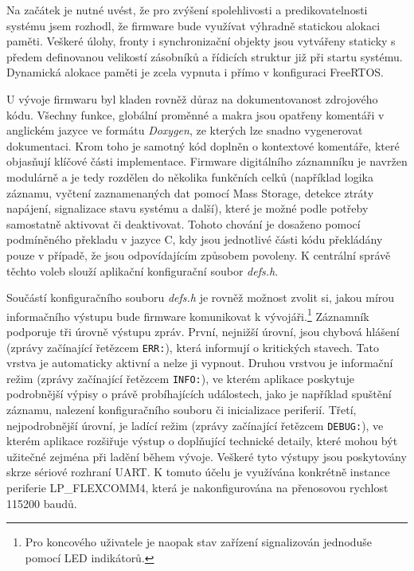 Na začátek je nutné uvést, že pro zvýšení spolehlivosti a predikovatelnosti systému jsem rozhodl, že firmware bude  využívat výhradně statickou alokaci paměti. Veškeré úlohy, fronty i synchronizační objekty jsou vytvářeny staticky s předem definovanou velikostí zásobníků a řídicích struktur již při startu systému. Dynamická alokace paměti je zcela vypnuta i přímo v konfiguraci FreeRTOS.

U vývoje firmwaru byl kladen rovněž důraz na dokumentovanost zdrojového kódu. Všechny funkce, globální proměnné a makra jsou opatřeny komentáři v anglickém jazyce ve formátu \textit{Doxygen}, ze kterých lze snadno vygenerovat dokumentaci. Krom toho je samotný kód doplněn o kontextové komentáře, které objasňují klíčové části implementace.
Firmware digitálního záznamníku je navržen modulárně a je tedy rozdělen do několika funkčních celků (například logika záznamu, vyčtení zaznamenaných dat pomocí Mass Storage, detekce ztráty napájení, signalizace stavu systému a další), které je možné podle potřeby samostatně aktivovat či deaktivovat. Tohoto chování je dosaženo pomocí podmíněného překladu v jazyce C, kdy jsou jednotlivé části kódu překládány pouze v případě, že jsou odpovídajícím způsobem povoleny. K centrální správě těchto voleb slouží aplikační konfigurační soubor 
\textit{defs.h}. 

Součástí konfiguračního souboru \textit{defs.h} je rovněž možnost zvolit si, jakou mírou informačního výstupu bude firmware komunikovat k vývojáři.\footnote{Pro koncového uživatele je naopak stav zařízení signalizován jednoduše pomocí LED indikátorů.} Záznamník podporuje tři úrovně výstupu zpráv. První, nejnižší úrovní, jsou chybová hlášení (zprávy začínající řetězcem \texttt{ERR:}), která informují o kritických stavech. Tato vrstva je automaticky aktivní a nelze ji vypnout. Druhou vrstvou je informační režim (zprávy začínající řetězcem \texttt{INFO:}), ve kterém aplikace poskytuje podrobnější výpisy o právě probíhajících událostech, jako je například spuštění záznamu, nalezení konfiguračního souboru či inicializace periferií. Třetí, nejpodrobnější úrovní, je ladící režim (zprávy začínající řetězcem \texttt{DEBUG:}), ve kterém aplikace rozšiřuje výstup o doplňující technické detaily, které mohou být užitečné zejména při ladění během vývoje. Veškeré tyto výstupy jsou poskytovány skrze sériové rozhraní UART. K tomuto účelu je využívána konkrétně instance periferie LP\_FLEXCOMM4, která je nakonfigurována na přenosovou rychlost 115200 baudů. 

